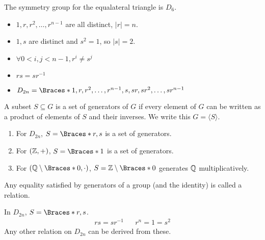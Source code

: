 \documentclass[a5paper]{article}
\begin{document}
\begin{example}
	The symmetry group for the equalateral triangle is $D_6$.
\end{example}

\begin{remark}
	\begin{itemize}
    \item $1,r,r^2,\ldots,r^{n-1}$ are all distinct, $|r|=n$.
    \item $1,s$ are distinct and $s^2=1$, so $|s|=2$.
    \item $\forall 0<i,j<n-1,r^i\neq s^j$
    \item $rs=sr^{-1}$
    \item $D_{2n}=\braces{1,r,r^2,\ldots,r^{n-1},s,sr,sr^2,\ldots,sr^{n-1}}$
  \end{itemize}
\end{remark}

\begin{definition}[Generator]
	A subset $S\subseteq G$ is a set of generators of $G$ if every element of $G$
  can be written as a product of elements of $S$ and their inverses. We write
  this $G=\langle S \rangle$.
\end{definition}

\begin{example}[Generators]
  \begin{enumerate}%
    \item For $D_{2n}$, $S=\braces{r,s}$ is a set of generators.
    \item For $(\mathbb{Z},+)$, $S=\braces{1}$ is a set of generators.
    \item For $(\Q\setminus\braces{0},\cdot)$, $S=\Z\setminus\braces{0}$
      generates $\mathbb{Q}$ multiplicatively.
  \end{enumerate}
\end{example}

\begin{definition}[Relation]
	Any equality satisfied by generators of a group (and the identity) is called a
  relation.
\end{definition}

\begin{example}[Relation]
  In $D_{2n}$, $S=\braces{r,s}$.
  \begin{align*}
    rs=sr^{-1} && r^n=1=s^2 
  \end{align*}
  Any other relation on $D_{2n}$ can be derived from these.
\end{example}
\end{document}
